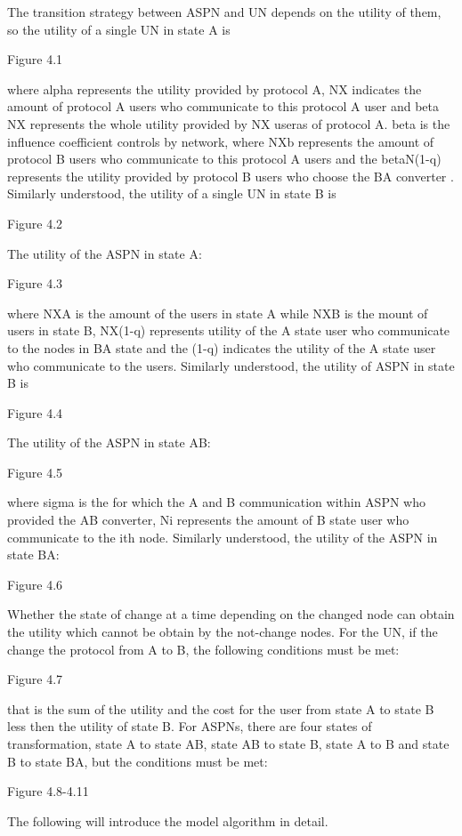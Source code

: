 \documentclass{article}
\begin{document}
The transition strategy between ASPN and UN depends on the utility of them, so the utility of a single UN in state A is

Figure 4.1

where alpha represents the utility provided by protocol A, NX indicates the amount of protocol A users who communicate to this protocol A user and beta NX represents the whole utility provided by NX useras of protocol A.  beta is the influence coefficient controls by network, where NXb represents the amount of protocol B users who communicate to this protocol A users and the betaN(1-q) represents the utility provided by protocol B users who choose the BA converter . Similarly understood, the utility of a single UN in state B is

Figure 4.2

The utility of the ASPN in state A:

Figure 4.3

where NXA is the amount of the users in state A while NXB is the mount  of users in state B, NX(1-q) represents  utility of the A state user who communicate to the nodes in BA state and the (1-q) indicates the utility of the A state user who communicate to the users. Similarly understood, the utility of ASPN in state B is

Figure 4.4

The utility of the ASPN in state AB:

Figure 4.5

where sigma is the for which the A and B  communication within ASPN who provided the AB converter, Ni represents the amount of B state user who communicate to the ith node. Similarly understood, the utility of the ASPN in state BA:

Figure 4.6

Whether the state of change at a time depending on the changed node can obtain the utility which cannot be obtain by the not-change nodes. For the UN, if the change the protocol from A to B, the following conditions must be met:

Figure 4.7

that is the sum of the utility  and the cost for the user from state A to state B less then the utility of state B. For ASPNs, there are four states of transformation, state A to state AB, state AB to state B, state A to B and state B to state BA, but the conditions must be met:

Figure 4.8-4.11

The following will introduce the model algorithm in detail.
\end{document}
